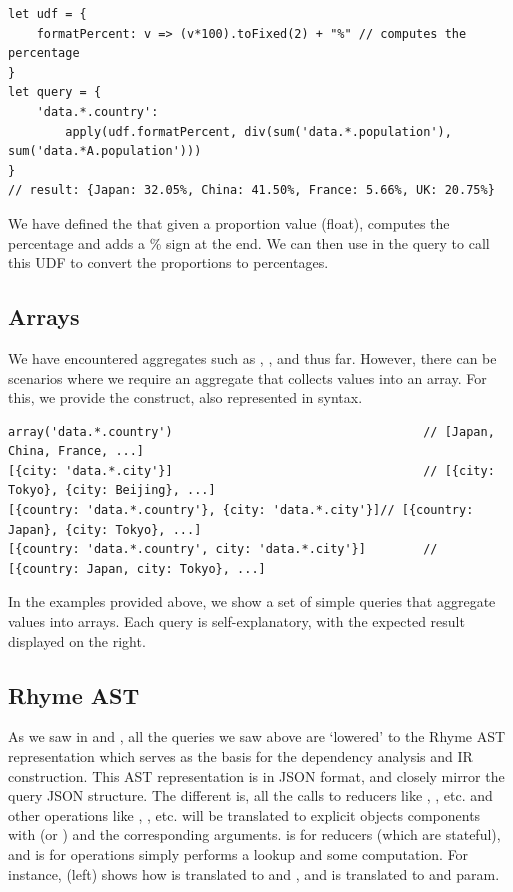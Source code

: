 \documentclass[runningheads]{llncs}
\newcommand{\lang}{Rhyme}
\begin{document}
\begin{lstlisting}[style=JavaScript, columns=flexible]
let udf = {
    formatPercent: v => (v*100).toFixed(2) + "%" // computes the percentage 
}
let query = {
    'data.*.country':
        apply(udf.formatPercent, div(sum('data.*.population'), sum('data.*A.population')))
}
// result: {Japan: 32.05%, China: 41.50%, France: 5.66%, UK: 20.75%}
\end{lstlisting}

We have defined the  that given a proportion value (float),
computes the percentage and adds a \% sign at the end.
We can then use  in the query to call this UDF to convert the
proportions to percentages.


\subsection{Arrays}
We have encountered aggregates such as , , and 
thus far.
However, there can be scenarios where we require an aggregate that collects values
into an array.
For this, we provide the  construct, also represented in \inline{[]} syntax.

\begin{lstlisting}[style=JavaScript, columns=flexible]
array('data.*.country')                                   // [Japan, China, France, ...]
[{city: 'data.*.city'}]                                   // [{city: Tokyo}, {city: Beijing}, ...]
[{country: 'data.*.country'}, {city: 'data.*.city'}]// [{country: Japan}, {city: Tokyo}, ...]
[{country: 'data.*.country', city: 'data.*.city'}]        // [{country: Japan, city: Tokyo}, ...]
\end{lstlisting}

In the examples provided above, we show a set of simple queries that aggregate values
into arrays.
Each query is self-explanatory, with the expected result displayed on the right.

\subsection{\lang{} AST}\label{subsec:ast}
As we saw in  and , all the queries we
saw above are `lowered' to the \lang{} AST representation which serves as the basis
for the dependency analysis and IR construction.
This AST representation is in JSON format, and closely mirror the query JSON structure.
The different is, all the calls to reducers like , , etc.
and other operations like , , etc. will be translated to
explicit objects components with  (or ) and the corresponding
arguments.
 is for reducers (which are stateful), and  is for operations
simply performs a lookup and some computation.
For instance,  (left) shows how  is translated to 
and , and  is translated to  and param.
\end{document}

